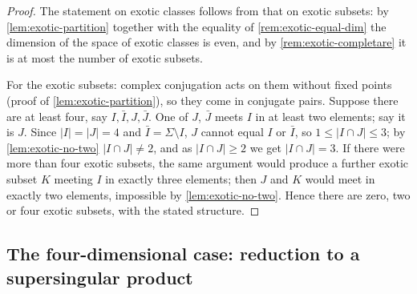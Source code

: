 \begin{proof}
  The statement on exotic classes follows from that on exotic subsets: by
  \cref{lem:exotic-partition} together with the equality of
  \cref{rem:exotic-equal-dim} the dimension of the space of exotic classes is
  even, and by \cref{rem:exotic-completare} it is at most the number of exotic
  subsets.

  For the exotic subsets: complex conjugation acts on them without fixed points
  (proof of \cref{lem:exotic-partition}), so they come in conjugate pairs.
  Suppose there are at least four, say \(I, \bar I, J, \bar J\). One of \(J\),
  \(\bar J\) meets \(I\) in at least two elements; say it is \(J\). Since
  \(|I| = |J| = 4\) and \(\bar I = \Sigma \setminus I\), \(J\) cannot equal \(I\)
  or \(\bar I\), so \(1 \le |I \cap J| \le 3\); by \cref{lem:exotic-no-two}
  \(|I \cap J| \neq 2\), and as \(|I \cap J| \ge 2\) we get \(|I \cap J| = 3\).
  If there were more than four exotic subsets, the same argument would produce a
  further exotic subset \(K\) meeting \(I\) in exactly three elements; then
  \(J\) and \(K\) would meet in exactly two elements, impossible by
  \cref{lem:exotic-no-two}. Hence there are zero, two or four exotic subsets,
  with the stated structure.
\end{proof}

\subsection*{The four-dimensional case: reduction to a supersingular product}

